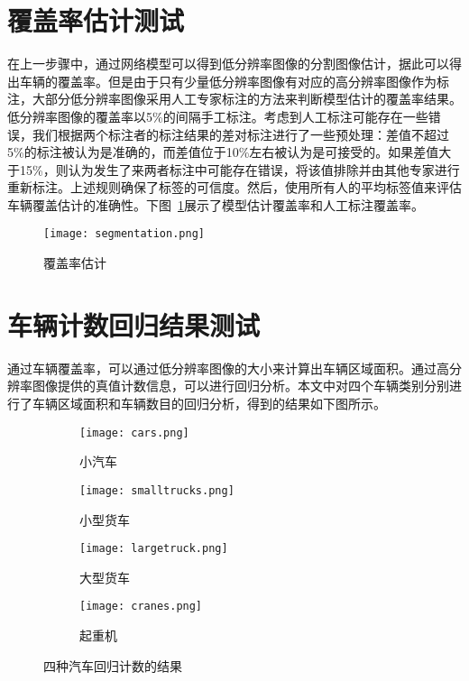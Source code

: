 \section{覆盖率估计测试}
在上一步骤中，通过网络模型可以得到低分辨率图像的分割图像估计，据此可以得出车辆的覆盖率。但是由于只有少量低分辨率图像有对应的高分辨率图像作为标注，大部分低分辨率图像采用人工专家标注的方法来判断模型估计的覆盖率结果。低分辨率图像的覆盖率以5\%的间隔手工标注。考虑到人工标注可能存在一些错误，我们根据两个标注者的标注结果的差对标注进行了一些预处理：差值不超过5\%的标注被认为是准确的，而差值位于10\%左右被认为是可接受的。如果差值大于15\%，则认为发生了来两者标注中可能存在错误，将该值排除并由其他专家进行重新标注。上述规则确保了标签的可信度。然后，使用所有人的平均标签值来评估车辆覆盖估计的准确性。下图~\ref{fig:seg}展示了模型估计覆盖率和人工标注覆盖率。
\begin{figure}[h]
    \centering
    \texttt{[image: segmentation.png]}
    \caption{覆盖率估计}
    \label{fig:seg}
\end{figure}

\section{车辆计数回归结果测试}
通过车辆覆盖率，可以通过低分辨率图像的大小来计算出车辆区域面积。通过高分辨率图像提供的真值计数信息，可以进行回归分析。本文中对四个车辆类别分别进行了车辆区域面积和车辆数目的回归分析，得到的结果如下图所示。
\begin{figure}[h]
    \centering
    \begin{subfigure}{0.45\textwidth}
      \texttt{[image: cars.png]}
      \caption{小汽车}
      \label{fig:subfig-a}
    \end{subfigure}\quad %
    \begin{subfigure}{0.45\textwidth}
      \texttt{[image: smalltrucks.png]}
      \caption{小型货车}
      \label{fig:subfig-b}
    \end{subfigure}
  
    \begin{subfigure}{0.45\textwidth}
      \texttt{[image: largetruck.png]}
      \caption{大型货车}
      \label{fig:subfig-c}
    \end{subfigure}\quad %
    \begin{subfigure}{0.45\textwidth}
      \texttt{[image: cranes.png]}
      \caption{起重机}
      \label{fig:subfig-d}
    \end{subfigure}
  
    \caption{四种汽车回归计数的结果}
    \label{fig:multi-image}
  \end{figure}

